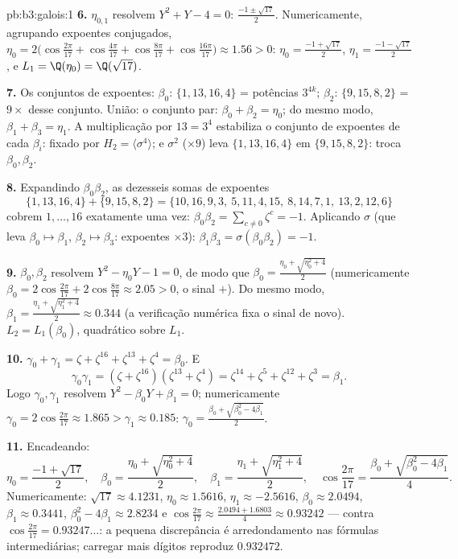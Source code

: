 \begin{solution}{pb:b3:galois:1}
\textbf{6.} $\eta_{0,1}$ resolvem $Y^2 + Y - 4 = 0$: $\frac{-1 \pm
\sqrt{17}}2$. Numericamente, agrupando expoentes conjugados,
$\eta_0 = 2\bigl(\cos\tfrac{2\pi}{17} + \cos\tfrac{4\pi}{17} +
\cos\tfrac{8\pi}{17} + \cos\tfrac{16\pi}{17}\bigr) \approx 1.56
> 0$: $\eta_0 = \frac{-1+\sqrt{17}}2$, $\eta_1 =
\frac{-1-\sqrt{17}}2$, e $L_1 = \Q(\eta_0) = \Q(\sqrt{17})$.

\textbf{7.} Os conjuntos de expoentes: $\beta_0$: $\{1, 13, 16, 4\}$ =
potências $3^{4k}$; $\beta_2$: $\{9, 15, 8, 2\}$ = $9 \times$ desse
conjunto. União: o conjunto par: $\beta_0 + \beta_2 = \eta_0$; do mesmo modo,
$\beta_1 + \beta_3 = \eta_1$. A multiplicação por $13 = 3^4$
estabiliza o conjunto de expoentes de cada $\beta_i$: fixado por $H_2 =
\langle\sigma^4\rangle$; e $\sigma^2$ ($\times 9$) leva
$\{1,13,16,4\}$ em $\{9, 15, 8, 2\}$: troca $\beta_0,
\beta_2$.

\textbf{8.} Expandindo $\beta_0\beta_2$, as dezesseis somas de
expoentes
\[
\{1,13,16,4\} + \{9,15,8,2\} =
\{10,16,9,3,\ 5,11,4,15,\ 8,14,7,1,\ 13,2,12,6\}
\]
cobrem $1, \dots, 16$ exatamente uma vez: $\beta_0\beta_2 =
\sum_{c\ne0}\zeta^c = -1$. Aplicando $\sigma$ (que leva
$\beta_0 \mapsto \beta_1$, $\beta_2 \mapsto \beta_3$:
expoentes $\times 3$): $\beta_1\beta_3 = \sigma(\beta_0\beta_2)
= -1$.

\textbf{9.} $\beta_0, \beta_2$ resolvem $Y^2 - \eta_0 Y - 1 = 0$,
de modo que $\beta_0 = \frac{\eta_0 + \sqrt{\eta_0^2 + 4}}2$ (numericamente
$\beta_0 = 2\cos\frac{2\pi}{17} + 2\cos\frac{8\pi}{17} \approx
2.05 > 0$, o sinal $+$). Do mesmo modo, $\beta_1 = \frac{\eta_1 +
\sqrt{\eta_1^2 + 4}}2 \approx 0.344$ (a verificação numérica fixa o
sinal de novo). $L_2 = L_1(\beta_0)$, quadrático sobre $L_1$.

\textbf{10.} $\gamma_0 + \gamma_1 = \zeta + \zeta^{16} +
\zeta^{13} + \zeta^4 = \beta_0$. E
\[
\gamma_0\gamma_1 = (\zeta + \zeta^{16})(\zeta^{13} + \zeta^4)
= \zeta^{14} + \zeta^{5} + \zeta^{12} + \zeta^{3} = \beta_1 .
\]
Logo $\gamma_0, \gamma_1$ resolvem $Y^2 - \beta_0Y + \beta_1 = 0$;
numericamente $\gamma_0 = 2\cos\frac{2\pi}{17} \approx 1.865 >
\gamma_1 \approx 0.185$: $\gamma_0 = \frac{\beta_0 +
\sqrt{\beta_0^2 - 4\beta_1}}2$.

\textbf{11.} Encadeando:
\[
\eta_0 = \frac{-1 + \sqrt{17}}2,
\quad
\beta_0 = \frac{\eta_0 + \sqrt{\eta_0^2 + 4}}2,
\quad
\beta_1 = \frac{\eta_1 + \sqrt{\eta_1^2 + 4}}2,
\quad
\cos\frac{2\pi}{17} = \frac{\beta_0 + \sqrt{\beta_0^2 -
4\beta_1}}4 .
\]
Numericamente: $\sqrt{17} \approx 4.1231$, $\eta_0 \approx
1.5616$, $\eta_1 \approx -2.5616$, $\beta_0 \approx 2.0494$,
$\beta_1 \approx 0.3441$, $\beta_0^2 - 4\beta_1 \approx
2.8234$ e $\cos\frac{2\pi}{17} \approx \frac{2.0494 +
1.6803}4 \approx 0.93242$ --- contra $\cos\frac{2\pi}{17} =
0.93247\dots$: a pequena discrepância é arredondamento nas
fórmulas intermediárias; carregar mais dígitos reproduz
$0.932472$.


\end{solution}
